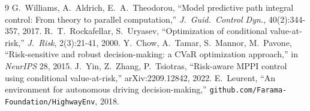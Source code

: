 \documentclass[letterpaper, 10 pt, conference]{ieeeconf}  %
\begin{document}
\begin{thebibliography}{9}\footnotesize
{} G.~Williams, A.~Aldrich, E.~A.~Theodorou, ``Model predictive path integral control: From theory to parallel computation,'' \emph{J.~Guid.\ Control Dyn.}, 40(2):344-357, 2017.
 R.~T.~Rockafellar, S.~Uryasev, ``Optimization of conditional value-at-risk,'' \emph{J.~Risk}, 2(3):21-41, 2000.
 Y.~Chow, A.~Tamar, S.~Mannor, M.~Pavone, ``Risk-sensitive and robust decision-making: a CVaR optimization approach,'' in \emph{NeurIPS} 28, 2015.
 J.~Yin, Z.~Zhang, P.~Tsiotras, ``Risk-aware MPPI control using conditional value-at-risk,'' arXiv:2209.12842, 2022.
 E.~Leurent, ``An environment for autonomous driving decision-making,'' \texttt{github.com/Farama-Foundation/HighwayEnv}, 2018.
\end{thebibliography}
\end{document}
